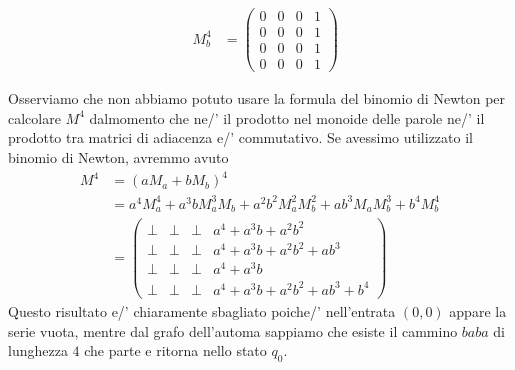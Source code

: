 \begin{ex}
\begin{sol}
\begin{enumerate}
\begin{align*}
&M_b^4 &=
\begin{pmatrix}
    0 & 0 & 0 & 1 \\
    0 & 0 & 0 & 1 \\
    0 & 0 & 0 & 1 \\
    0 & 0 & 0 & 1
\end{pmatrix}
\end{align*}
\end{enumerate}
Osserviamo
che non abbiamo potuto usare
la formula del binomio di Newton per calcolare $M^4$
dalmomento che ne/' il prodotto nel monoide delle parole ne/'
 il prodotto tra matrici di adiacenza e/' commutativo. 
Se avessimo utilizzato il binomio di Newton, 
avremmo avuto
\begin{align*}
        M^4
        &=
        (aM_a + bM_b)^4
        \\ &=
a^4 M_a^4 + a^3 b M_a^3 M_b + a^2 b^2 M_a^2 M_b^2 + a b^3 M_a M_b^3 + b^4 M_b^4 
\\ & =
\begin{pmatrix}
    \bot & \bot& \bot & a^4 + a^3b + a^2b^2 \\
    \bot& \bot & \bot & a^4 + a^3b + a^2b^2 + ab^3 \\
    \bot & \bot & \bot & a^4 + a^3b \\
    \bot & \bot & \bot & a^4 + a^3b + a^2b^2 + ab^3 + b^4
\end{pmatrix}
    \end{align*}
Questo risultato e/' chiaramente sbagliato poiche/'
nell'entrata $(0,0)$ appare la serie vuota,
mentre dal grafo dell'automa sappiamo che esiste il cammino 
$baba$ di lunghezza $4$ che parte e ritorna nello stato $q_0$.
\end{sol}
\end{ex}

\newpage

